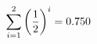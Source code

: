 \documentclass[preview]{standalone}
\begin{document}
\begin{align*}
\sum_{i=1}^{ 2 } \left({ 1 } \over {2} \right)^i = { 0.750 }
\end{align*}
\end{document}
